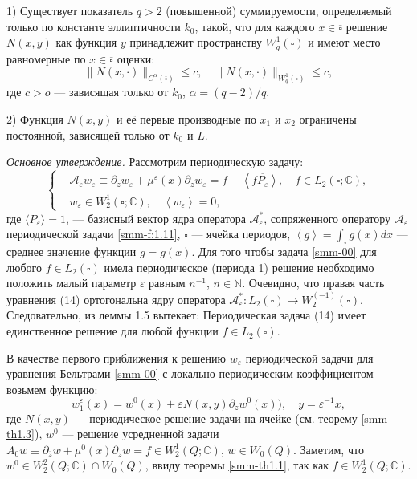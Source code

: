 \documentclass[a4paper,12pt]{article}
\theoremstyle{definition}
\def\<{\left<}
\def\>{\right>}
\begin{document}
	1) Существует показатель $q>2$ (повышенной) суммируемости, определяемый только по константе эллиптичности $k_0$, такой, что  для каждого $x\in\overline\square$ решение $N(x,y)$ как функция $y$ принадлежит пространству $W_q^1(\square)$ и имеют место равномерные по $x\in\overline\square$ оценки:
	$$
	\|N(x,\cdot)\|_{C^\alpha(\overline\square)}\leqslant c,\quad \|N(x,\cdot)\|_{W_q^1(\square)}\leqslant c,
	$$
	где $c>o$ --- зависящая только от $k_0$, $\alpha=(q-2)/q$.
	
	2) Функция $N(x,y)$ и её первые производные по $x_1$ и $x_2$ ограничены постоянной,
	зависящей только от $k_0$ и $L$.
	
	\textit{Основное утверждение.}
	Рассмотрим периодическую задачу:
	\begin{equation}\label{smm-00}
	\left\{\begin{aligned}
	&\mathscr{A}_\varepsilon w_\varepsilon\equiv \partial_{\bar{z}}w_\varepsilon +\mu^\varepsilon(x) \partial_{z}w_\varepsilon =f-\<f\overline{P_\varepsilon}\>,\quad f\in L_2(\square;\mathbb{C}),\\
	&w_\varepsilon\in W_2^1(\square;\mathbb{C}),	\quad \<w_\varepsilon\>=0,
	\end{aligned}\right.	
	\end{equation}
	   		где $\langle P_\varepsilon\rangle=1$, --- базисный вектор ядра оператора $\mathscr{A}_\varepsilon^\ast$, сопряженного оператору $\mathscr{A}_\varepsilon$ периодической задачи \eqref{smm-f:1.11}, $\square$ --- ячейка периодов, $\<g\>=\int_\square g(x)dx$ --- среднее значение функции  $g=g(x)$. Для того чтобы задача \eqref{smm-00} для любого $f\in L_2(\square)$ имела периодическое (периода 1) решение необходимо положить малый параметр $\varepsilon$ равным $n^{-1}$, $n\in \mathbb{N}$.
		Очевидно, что правая часть  уравнения  (14) ортогональна ядру оператора $\mathscr{A}_\varepsilon^\ast:L_2 (\square)\to W_2^(-1) (\square)$. Следовательно, из леммы 1.5 вытекает: Периодическая задача (14) имеет единственное решение для любой функции $f\in L_2(\square)$.
		
	
	В качестве первого приближения к решению $w_\varepsilon$  периодической задачи
	для уравнения Бельтрами \eqref{smm-00} с локально-периодическим коэффициентом возьмем функцию:
	$$ w_1^\varepsilon(x)=w^0(x)+\varepsilon N(x,y)\partial_zw^0(x)), \quad y=\varepsilon^{-1}x,$$
где $N(x,y)$  --- периодическое решение задачи на ячейке (см. теорему \ref{smm-th1.3}), $w^0$ --- решение усредненной задачи $A_0w\equiv\partial_{\overline{z}}w+\mu^0(x)\partial_zw=f\in W_2^1(Q;\mathbb{C})$, $w\in W_0(Q)$. Заметим, что $w^0\in W_2^2(Q;\mathbb{C})\cap W_0(Q)$, ввиду 	теоремы \ref{smm-th1.1}, так как $f\in W_2^1(Q;\mathbb{C})$.
	
\end{document}
